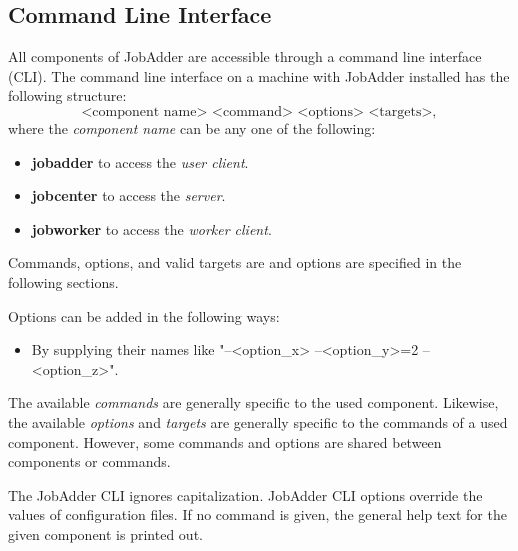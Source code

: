 \newcommand{\jacommand}[3]{

\textsc{\large{\textbf{#1}}}
\begin{itemize}
\item[\textbf{Options:}] #2
\item[\textbf{Effect:}] #3
\end{itemize}
}
\newcommand{\jaoption}[3]{
\begin{itemize}
\item[] \textbf{#1} (#2)
\item[\textbf{Effect:}] #3
\end{itemize}
}
\subsection{Command Line Interface}
All components of JobAdder are accessible through a command line interface (CLI).
The command line interface on a machine with JobAdder installed has the following structure:
\begin{equation}
\text{<component name> <command> <options> <targets>},
\end{equation}
where the \textit{component name} can be any one of the following:
\begin{itemize}
\item \textbf{jobadder} to access the \textit{user client}.
\item \textbf{jobcenter} to access the \textit{server}.
\item \textbf{jobworker} to access the \textit{worker client}.
\end{itemize}
Commands, options, and valid targets are and options are specified in the following sections.

Options can be added in the following ways:
\begin{itemize}
\item By supplying their names like "--<option\_x> --<option\_y>=2 --<option\_z>".
\end{itemize}

The available \textit{commands} are generally specific to the used component.
Likewise, the available \textit{options} and \textit{targets} are generally specific to the commands of a used component.
However, some commands and options are shared between components or commands.

The JobAdder CLI ignores capitalization.
JobAdder CLI options override the values of configuration files.
If no command is given, the general help text for the given component is printed out.
